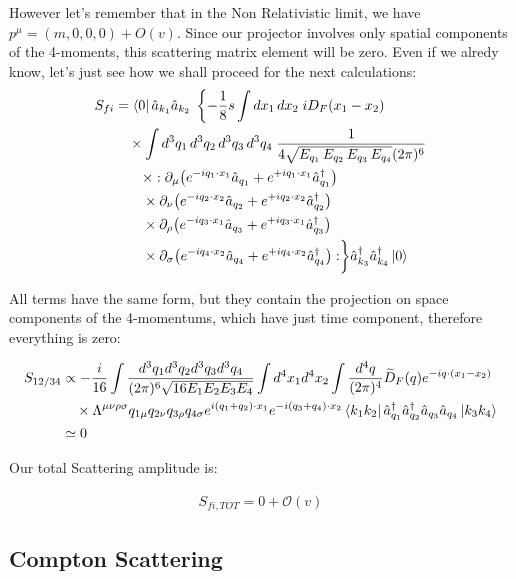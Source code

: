 \documentclass[12pt,a4paper]{article}
\begin{document}
However let's remember that in the Non Relativistic limit, we have $
p^\mu=(m,0,0,0) + O(v) $.
Since our projector involves only spatial components of the 4-moments, this scattering matrix element will be zero. 
Even if we alredy know, let's just see how we shall proceed for the next calculations:
\begin{align*}
S_{fi} &= \bra{0}\hat{a}_{k_1}\hat{a}_{k_2} \;
 \left\{-\frac{1}{8}s \int dx_1\, dx_2 \;
i D_F(x_1 - x_2)
\right. \notag \\
&\quad \times \int d^3 q_1\, d^3 q_2\, d^3 q_3\, d^3 q_4
\;
\frac{1}{4\sqrt{E_{q_1}\, E_{q_2}\, E_{q_3}\, E_{q_4}}(2\pi)^6}
\\
&\qquad \times :
\partial_\mu\!\left(e^{-iq_1\cdot x_1}\hat{a}_{q_1}
+ e^{+iq_1\cdot x_1}\hat{a}^\dagger_{q_1}\right)
\\
&\qquad \times \partial_\nu\!\left(e^{-iq_2\cdot x_2}\hat{a}_{q_2}
+ e^{+iq_2\cdot x_2}\hat{a}^\dagger_{q_2}\right)
\\
&\qquad \times \partial_\rho\!\left(e^{-iq_3\cdot x_1}\hat{a}_{q_3}
+ e^{+iq_3\cdot x_1}\hat{a}^\dagger_{q_3}\right)
\\
&\qquad \times \partial_\sigma\!\left(e^{-iq_4\cdot x_2}\hat{a}_{q_4}
+ e^{+iq_4\cdot x_2}\hat{a}^\dagger_{q_4}\right)
: \biggr\}
\hat{a}^\dagger_{k_3}\hat{a}^\dagger_{k_4}\ket{0}
\end{align*}

All terms have the same form, but they contain the projection on space components of the 4-momentums, which have just time component, therefore everything is zero:

\begin{align} 
S_{12/34} & \propto -\frac{i}{16} \int \frac{d^3q_1 d^3q_2 d^3q_3 d^3q_4}{(2\pi)^6 \sqrt{16E_1E_2E_3E_4}} \int d^4x_1 d^4x_2 \int \frac{d^4 q}{(2\pi)^4} \widetilde{D}_F(q) e^{-iq\cdot(x_1-x_2)} \nonumber \\
& \quad \times \Lambda^{\mu\nu\rho\sigma} q_{1\mu} q_{2\nu} q_{3\rho} q_{4\sigma} e^{i(q_1+q_2)\cdot x_1} e^{-i(q_3+q_4)\cdot x_2} \bra{k_1k_2}\hat{a}_{q_1}^\dagger\hat{a}_{q_2}^\dagger\hat{a}_{q_3}\hat{a}_{q_4}\ket{k_3k_4} \\
&\simeq 0
\end{align}

Our total Scattering amplitude is:

\begin{align}
\boxed{
    S_{fi,TOT}=0 + \mathcal{O}(v)}
\end{align}

\subsection*{Compton Scattering}
\end{document}

